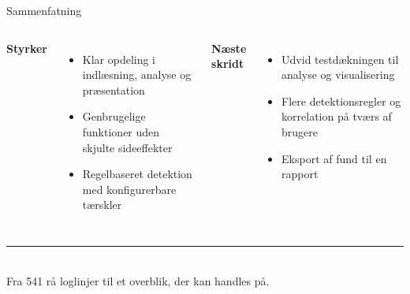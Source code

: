 \documentclass[aspectratio=169,10pt]{beamer}
\begin{document}
\begin{frame}{Sammenfatning}
  \begin{columns}[T]
      \textbf{Styrker}
      \vspace{0.3em}
      \begin{itemize}
        \item Klar opdeling i indlæsning, analyse og præsentation
        \item Genbrugelige funktioner uden skjulte sideeffekter
        \item Regelbaseret detektion med konfigurerbare tærskler
      \end{itemize}
      \textbf{Næste skridt}
      \vspace{0.3em}
      \begin{itemize}
        \item Udvid testdækningen til analyse og visualisering
        \item Flere detektionsregler og korrelation på tværs af brugere
        \item Eksport af fund til en rapport
      \end{itemize}
  \end{columns}
  \vfill
  \begin{center}
    {\color{accent}\rule{4cm}{1.5pt}}\\[0.4em]
    {\footnotesize\color{muted}Fra 541 rå loglinjer til et overblik, der kan handles på.}
  \end{center}
\end{frame}
\end{document}
